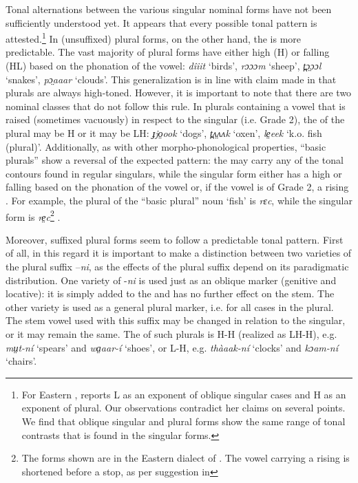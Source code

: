 \documentclass[output=paper
,newtxmath
,modfonts
,nonflat]{langsci/langscibook}
\begin{document}
Tonal alternations between the various singular nominal forms have not been sufficiently understood yet.  It appears that every possible tonal pattern is attested.\footnote{For Eastern , \citet{gjersøe2017} reports L  as an exponent of oblique singular cases and H  as an exponent of  plural.  Our observations contradict her claims on several points.  We find that oblique singular and  plural forms show the same range of tonal contrasts that is found in the  singular forms.}  In (unsuffixed) plural forms, on the other hand, the  is more predictable.  The vast majority of plural forms have either high (H) or falling (HL)  based on the phonation of the vowel:  \textit{dîiit} ‘birds’, \textit{rɔɔɔm} ‘sheep’, \textit{t̪}\textit{ɔ̤ɔɔl} ‘snakes’, \textit{pɔ̤aaar} ‘clouds’.  This generalization is in line with claim made in \citet{gjersøe2017} that plurals are always high-toned.  However, it is important to note that there are two nominal classes that do not follow this rule.  In plurals containing a vowel that is raised (sometimes vacuously) in respect to the singular (i.e. Grade 2), the  of the plural may be H or it may be LH: \textit{ɟjo̤ook} ‘dogs’, \textit{t̪}\textit{ʌ̤ʌʌk} ‘oxen’, \textit{le̤eek} ‘k.o. fish (plural)’.  Additionally, as with other morpho-phonological properties, “basic plurals” show a reversal of the expected pattern: the  may carry any of the tonal contours found in regular singulars, while the singular form either has a high or falling  based on the phonation of the vowel or, if the vowel is of Grade 2, a rising .  For example, the plural of the “basic plural” noun ‘fish’ is \textit{rɛc}, while the singular form is \textit{re̤c}\footnote{The forms shown are in the Eastern dialect of .  The vowel carrying a rising  is shortened before a stop, as per suggestion in } . 

Moreover, suffixed plural forms seem to follow a predictable tonal pattern.  First of all, in this regard it is important to make a distinction between two varieties of the plural suffix –\textit{ni}, as the effects of the plural suffix depend on its paradigmatic distribution. One variety of -\textit{ni} is used just as an oblique marker (genitive and locative): it is simply added to the   and has no further effect on the stem. The other variety is used as a general plural marker, i.e. for all cases in the plural. The stem vowel used with this suffix may be changed in relation to the  singular, or it may remain the same.  The  of such plurals is H-H (realized as LH-H), e.g. \textit{mṳt-ní} ‘spears’ and \textit{wa̤aar-í} ‘shoes’, or L-H, e.g. \textit{thàaak-ní} ‘clocks’ and \textit{kɔam-ní} ‘chairs’.
\end{document}
